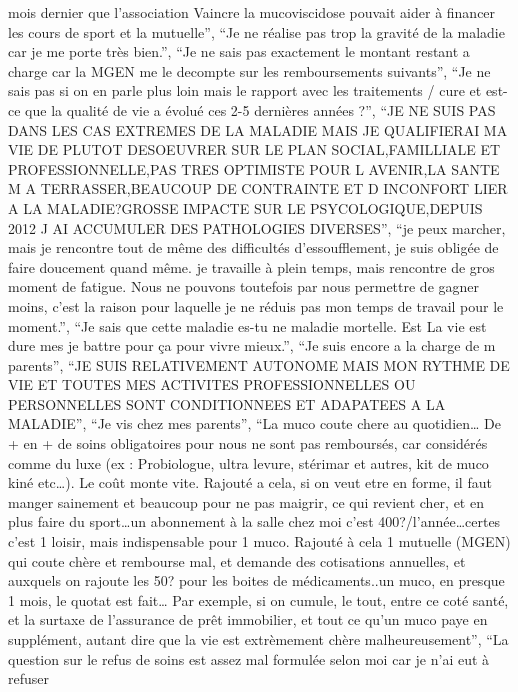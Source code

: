 \documentclass[
  letterpaper,
  DIV=11,
  numbers=noendperiod]{scrartcl}
\begin{document}
\begin{itemize}
  mois dernier que l'association Vaincre la mucoviscidose pouvait aider
  à financer les cours de sport et la mutuelle'', ``Je ne réalise pas
  trop la gravité de la maladie car je me porte très bien.'', ``Je ne
  sais pas exactement le montant restant a charge car la MGEN me le
  decompte sur les remboursements suivants'', ``Je ne sais pas si on en
  parle plus loin mais le rapport avec les traitements / cure et est-ce
  que la qualité de vie a évolué ces 2-5 dernières années ?'', ``JE NE
  SUIS PAS DANS LES CAS EXTREMES DE LA MALADIE MAIS JE QUALIFIERAI MA
  VIE DE PLUTOT DESOEUVRER SUR LE PLAN SOCIAL,FAMILLIALE ET
  PROFESSIONNELLE,PAS TRES OPTIMISTE POUR L AVENIR,LA SANTE M A
  TERRASSER,BEAUCOUP DE CONTRAINTE ET D INCONFORT LIER A LA
  MALADIE?GROSSE IMPACTE SUR LE PSYCOLOGIQUE,DEPUIS 2012 J AI ACCUMULER
  DES PATHOLOGIES DIVERSES'', ``je peux marcher, mais je rencontre tout
  de même des difficultés d'essoufflement, je suis obligée de faire
  doucement quand même. je travaille à plein temps, mais rencontre de
  gros moment de fatigue. Nous ne pouvons toutefois par nous permettre
  de gagner moins, c'est la raison pour laquelle je ne réduis pas mon
  temps de travail pour le moment.'', ``Je sais que cette maladie es-tu
  ne maladie mortelle. Est La vie est dure mes je battre pour ça pour
  vivre mieux.'', ``Je suis encore a la charge de m parents'', ``JE SUIS
  RELATIVEMENT AUTONOME MAIS MON RYTHME DE VIE ET TOUTES MES ACTIVITES
  PROFESSIONNELLES OU PERSONNELLES SONT CONDITIONNEES ET ADAPATEES A LA
  MALADIE'', ``Je vis chez mes parents'', ``La muco coute chere au
  quotidien\ldots{} De + en + de soins obligatoires pour nous ne sont
  pas remboursés, car considérés comme du luxe (ex : Probiologue, ultra
  levure, stérimar et autres, kit de muco kiné etc\ldots). Le coût monte
  vite. Rajouté a cela, si on veut etre en forme, il faut manger
  sainement et beaucoup pour ne pas maigrir, ce qui revient cher, et en
  plus faire du sport\ldots un abonnement à la salle chez moi c'est
  400?/l'année\ldots certes c'est 1 loisir, mais indispensable pour 1
  muco. Rajouté à cela 1 mutuelle (MGEN) qui coute chère et rembourse
  mal, et demande des cotisations annuelles, et auxquels on rajoute les
  50? pour les boites de médicaments..un muco, en presque 1 mois, le
  quotat est fait\ldots{} Par exemple, si on cumule, le tout, entre ce
  coté santé, et la surtaxe de l'assurance de prêt immobilier, et tout
  ce qu'un muco paye en supplément, autant dire que la vie est
  extrèmement chère malheureusement'', ``La question sur le refus de
  soins est assez mal formulée selon moi car je n'ai eut à refuser

\end{itemize}
\end{document}
